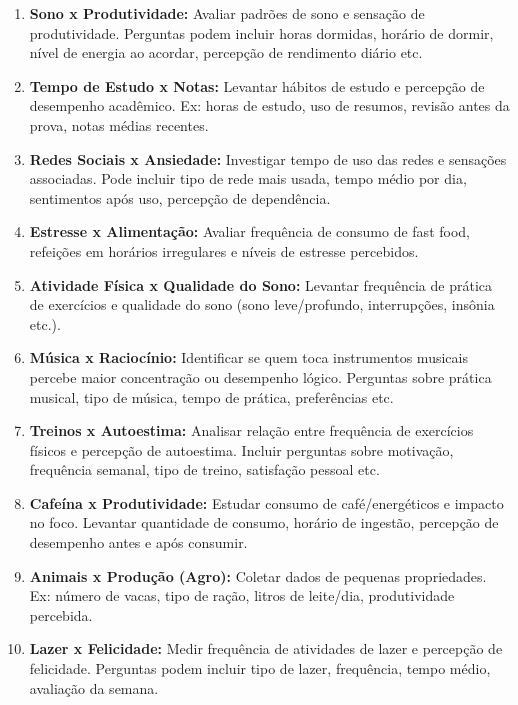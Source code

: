 \documentclass[12pt,a4paper]{article}
\begin{document}
\begin{enumerate}
    \item \textbf{Sono x Produtividade:} Avaliar padrões de sono e sensação de produtividade. Perguntas podem incluir horas dormidas, horário de dormir, nível de energia ao acordar, percepção de rendimento diário etc.
    
    \item \textbf{Tempo de Estudo x Notas:} Levantar hábitos de estudo e percepção de desempenho acadêmico. Ex: horas de estudo, uso de resumos, revisão antes da prova, notas médias recentes.
    
    \item \textbf{Redes Sociais x Ansiedade:} Investigar tempo de uso das redes e sensações associadas. Pode incluir tipo de rede mais usada, tempo médio por dia, sentimentos após uso, percepção de dependência.
    
    \item \textbf{Estresse x Alimentação:} Avaliar frequência de consumo de fast food, refeições em horários irregulares e níveis de estresse percebidos.
    
    \item \textbf{Atividade Física x Qualidade do Sono:} Levantar frequência de prática de exercícios e qualidade do sono (sono leve/profundo, interrupções, insônia etc.).
    
    \item \textbf{Música x Raciocínio:} Identificar se quem toca instrumentos musicais percebe maior concentração ou desempenho lógico. Perguntas sobre prática musical, tipo de música, tempo de prática, preferências etc.
    
    \item \textbf{Treinos x Autoestima:} Analisar relação entre frequência de exercícios físicos e percepção de autoestima. Incluir perguntas sobre motivação, frequência semanal, tipo de treino, satisfação pessoal etc.
    
    \item \textbf{Cafeína x Produtividade:} Estudar consumo de café/energéticos e impacto no foco. Levantar quantidade de consumo, horário de ingestão, percepção de desempenho antes e após consumir.
    
    \item \textbf{Animais x Produção (Agro):} Coletar dados de pequenas propriedades. Ex: número de vacas, tipo de ração, litros de leite/dia, produtividade percebida.

\hfill
\vspace{1cm}
    
    \item \textbf{Lazer x Felicidade:} Medir frequência de atividades de lazer e percepção de felicidade. Perguntas podem incluir tipo de lazer, frequência, tempo médio, avaliação da semana.
\end{enumerate}
\end{document}
